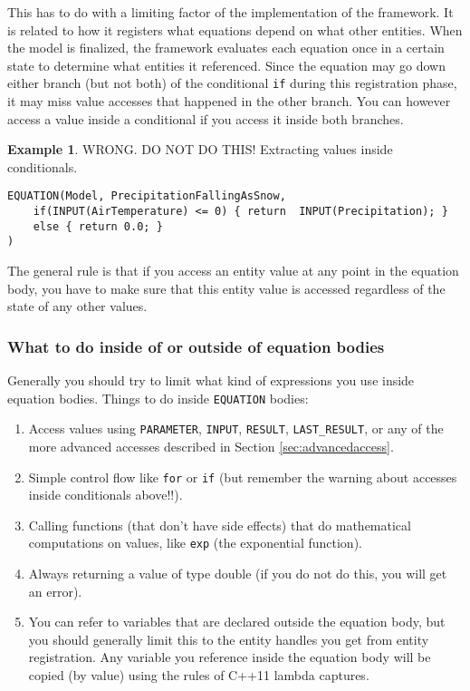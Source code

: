 \documentclass[11pt]{article}
\theoremstyle{definition}
\newtheorem{myexample}{Example}
\newenvironment{example}%
  {\begin{lrbox}{\examplebox}%
   \begin{minipage}{\dimexpr\linewidth-2\fboxsep}
   \begin{myexample}}%
  {\end{myexample}%
   \end{minipage}%
   \end{lrbox}%
   \begin{trivlist}
     \item[]\colorbox{silver}{\usebox\examplebox}
   \end{trivlist}}
\begin{document}
This has to do with a limiting factor of the implementation of the framework. It is related to how it registers what equations depend on what other entities. When the model is finalized, the framework evaluates each equation once in a certain state to determine what entities it referenced. Since the equation may go down either branch (but not both) of the conditional {\tt if} during this registration phase, it may miss value accesses that happened in the other branch. You can however access a value inside a conditional if you access it inside both branches.

\begin{example}\label{ex:simplypequations}
WRONG. DO NOT DO THIS! Extracting values inside conditionals.
\begin{lstlisting}[style=mycpp]
EQUATION(Model, PrecipitationFallingAsSnow,
	if(INPUT(AirTemperature) <= 0) { return  INPUT(Precipitation); }
	else { return 0.0; }
)
\end{lstlisting}
\end{example}

The general rule is that if you access an entity value at any point in the equation body, you have to make sure that this entity value is accessed regardless of the state of any other values.

\subsubsection{What to do inside of or outside of equation bodies}

Generally you should try to limit what kind of expressions you use inside equation bodies. Things to do inside {\tt EQUATION} bodies:
\begin{enumerate}[i]
\item Access values using {\tt PARAMETER}, {\tt INPUT}, {\tt RESULT}, {\tt LAST\_RESULT}, or any of the more advanced accesses described in Section \ref{sec:advancedaccess}.
\item Simple control flow like {\tt for} or {\tt if} (but remember the warning about accesses inside conditionals above!!).
\item Calling functions (that don't have side effects) that do mathematical computations on values, like {\tt exp} (the exponential function).
\item Always returning a value of type double (if you do not do this, you will get an error).
\item You can refer to variables that are declared outside the equation body, but you should generally limit this to the entity handles you get from entity registration. Any variable you reference inside the equation body will be copied (by value) using the rules of C++11 lambda captures.
\end{enumerate}
\end{document}
